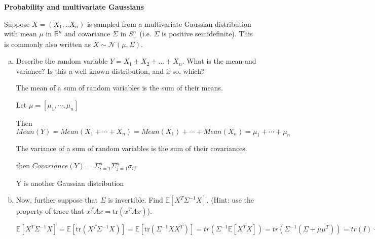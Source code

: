 \item {} \textbf{Probability and multivariate Gaussians}

  Suppose $X=(X_1,..X_n)$ is sampled from a multivariate Gaussian
  distribution with mean $\mu$ in $\mathbb{R}^n$ and covariance $\Sigma$ in $S^n_+$
  (i.e. $\Sigma$ is positive semidefinite).
  This is commonly also written as $X \sim \mathcal{N}(\mu, \Sigma)$.

  \begin{enumerate}[(a)]
  \item
  Describe the random variable $Y = X_1 + X_2 + \ldots + X_n$.
  What is the mean and variance?
  Is this a well known distribution, and if so, which?

  The mean of a sum of random variables is the sum of their means. 
  
  Let $\mu = [\mu_1, \cdots, \mu_n]$

  Then $Mean(Y) = Mean(X_1 + \cdots + X_n) = Mean(X_1) + \cdots + Mean(X_n) = \mu_1 + \cdots + \mu_n$

  The variance of a sum of random variables is the sum of their covariances.

  then $Covariance(Y) = \Sigma^n_{i=1}\Sigma^n_{j=1} \sigma_{ij}$

  Y is another Gaussian distribution

  \item
  Now, further suppose that $\Sigma$ is invertible. Find $\mathbb{E}[X^T\Sigma^{-1}X]$.
  (Hint: use the property of trace that $x^TAx = \text{tr}(x^TAx)$).

  $\mathbb{E}[X^T\Sigma^{-1}X] =  \mathbb{E}[\text{tr}(X^T\Sigma^{-1}X)] = \mathbb{E}[\text{tr}(\Sigma^{-1}X X^T)] = tr(\Sigma^{-1}\mathbb{E}[X^T X]) = tr(\Sigma^{-1}(\Sigma + \mu\mu^T)) = tr(I) + tr(\Sigma^{-1}\mu\mu^T) = n + \mu^T\Sigma^{-1}\mu$

  \end{enumerate}

